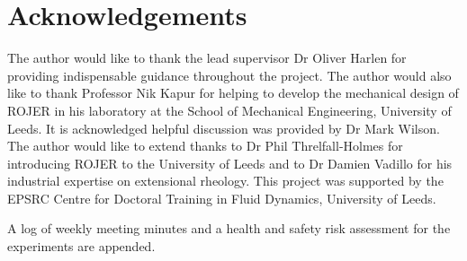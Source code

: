 \documentclass[11pt]{article}
\begin{document}
\section{Acknowledgements}
The author would like to thank the lead supervisor Dr Oliver Harlen for providing indispensable guidance throughout the project. The author would also like to thank Professor Nik Kapur for helping to develop the mechanical design of ROJER in his laboratory at the School of Mechanical Engineering, University of Leeds. It is acknowledged helpful discussion was provided by Dr Mark Wilson. The author would like to extend thanks to Dr Phil Threlfall-Holmes for introducing ROJER to the University of Leeds and to Dr Damien Vadillo for his industrial expertise on extensional rheology. This project was supported by the EPSRC Centre for Doctoral Training in Fluid Dynamics, University of Leeds.

\newpage

\begin{spacing}{0.9}


\end{spacing}

\newpage

\begin{appendices}
A log of weekly meeting minutes and a health and safety risk assessment for the experiments are appended.
\end{appendices}
\end{document}
